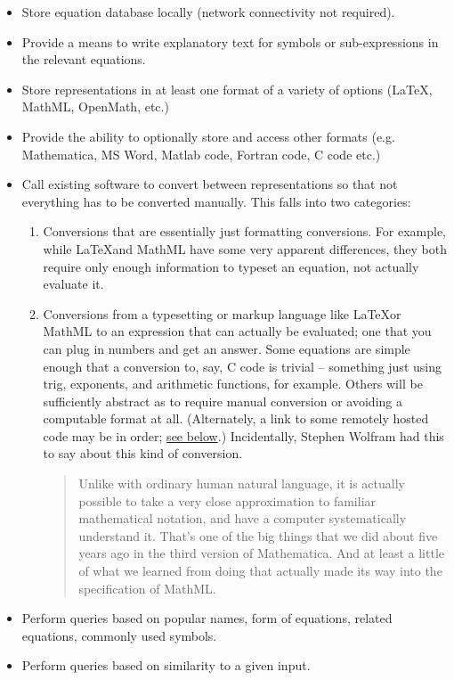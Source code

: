\documentclass[12pt,letterpaper]{article}
\begin{document}
\begin{itemize}
\item Store equation database locally (network connectivity not required).
\item Provide a means to write explanatory text for symbols or sub-expressions in the relevant equations.
\item Store representations in at least one format of a variety of options (\LaTeX, MathML, OpenMath, etc.)
\item Provide the ability to optionally store and access other formats (e.g. Mathematica, MS Word, Matlab code, Fortran code, C code etc.)
\item Call existing software to convert between representations so that not everything has to be converted manually. This falls into two categories:
\begin{enumerate}
\item Conversions that are essentially just formatting conversions. For example, while \LaTeX and MathML have some very apparent differences, they both require only enough information to typeset an equation, not actually evaluate it.
\item Conversions from a typesetting or markup language like \LaTeX or MathML to an expression that can actually be evaluated; one that you can plug in numbers and get an answer. Some equations are simple enough that a conversion to, say, C code is trivial -- something just using trig, exponents, and arithmetic functions, for example. Others will be sufficiently abstract as to require manual conversion or avoiding a computable format at all. (Alternately, a link to some remotely hosted code may be in order; \hyperref[linking]{see below}.) Incidentally, Stephen Wolfram had this to say about this kind of conversion.
\begin{quote}
Unlike with ordinary human natural language, it is actually possible to take a very close approximation to familiar mathematical notation, and have a computer systematically understand it. That's one of the big things that we did about five years ago in the third version of Mathematica. And at least a little of what we learned from doing that actually made its way into the specification of MathML. 
\end{quote}
\end{enumerate}
\item Perform queries based on popular names, form of equations, related equations, commonly used symbols.
\item Perform queries based on similarity to a given input.

\end{itemize}
\end{document}
